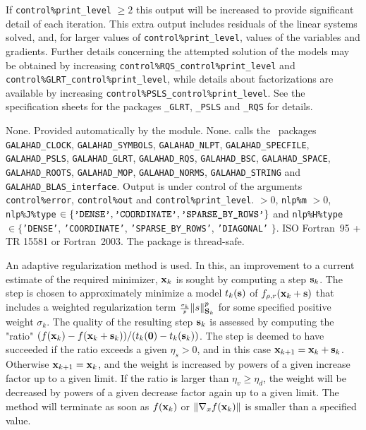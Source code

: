 \documentclass{galahad}
\newcommand{\packagename}{NLS}
\begin{document}
If {\tt control\%print\_level} $\geq 2$ this
output will be increased to provide significant detail of each iteration.
This extra output includes residuals of the linear systems solved, and,
for larger values of {\tt control\%print\_level}, values of the variables
and gradients. Further details concerning the attempted solution of the models
may be obtained by increasing
{\tt control\%RQS\_control\%print\_level}
and
{\tt control\%GLRT\_control\%print\_level},
while details about factorizations are available
by increasing
{\tt control\%PSLS\_control\%print\_level}.
See the specification sheets for the packages
{\tt \libraryname\_GLRT},
{\tt \libraryname\_PSLS} and
{\tt \libraryname\_RQS}
for details.


\galgeneral

\galcommon None.
\galworkspace Provided automatically by the module.
\galroutines None.
\galmodules {\tt \packagename\_solve} calls the \galahad\ packages
{\tt GALAHAD\_CLOCK},
{\tt GALAHAD\_SY\-M\-BOLS}, \sloppy
{\tt GALAHAD\_NLPT},
{\tt GALAHAD\_SPECFILE},
{\tt GALAHAD\_PSLS},
{\tt GALAHAD\_GLRT},
{\tt GALAHAD\_RQS},
{\tt GALAHAD\_BSC},
{\tt GALAHAD\_SPACE},
{\tt GALAHAD\_ROOTS},
{\tt GALAHAD\_MOP},
{\tt GALAHAD\_NORMS},
{\tt GALAHAD\_STRING}
and
{\tt GALAHAD\_BLAS\_interface}.
\galio Output is under control of the arguments
 {\tt control\%error}, {\tt control\%out} and
{\tt control\%print\_level}.
 $> 0$, {\tt nlp\%m} $> 0$,
{\tt nlp\%J\%type} $\in \{
  \mbox{\tt 'DENSE'}, \mbox{\tt 'COORDINATE'}, \mbox{\tt 'SPARSE\_BY\_ROWS'}
 \}$ and
{\tt nlp\%H\%type} $\in \{${\tt 'DENSE'},
 {\tt 'COORDINATE'}, {\tt 'SPARSE\_BY\_ROWS'}, {\tt 'DIAGONAL'} $\}$.
\galportability ISO Fortran~95 + TR 15581 or Fortran~2003.
The package is thread-safe.


\galmethod
An adaptive regularization method is used.
In this, an improvement to a current
estimate of the required minimizer, ${\mathbf{x}}_k$ is sought by computing a
step ${\mathbf{s}}_k$. The step is chosen to approximately minimize a model $t_k({\mathbf{s}})$
of $f_{\rho,r}({\mathbf{x}}_k+{\mathbf{s}})$
that includes a weighted regularization term
${\scriptstyle \frac{\sigma_k}{p}} \|s\|_{{\mathbf{S}}_k}^p$
for some specified positive weight $\sigma_k$. The quality of the
resulting step ${\mathbf{s}}_k$ is assessed by computing the "ratio"
$(f({\mathbf{x}}_k) - f({\mathbf{x}}_k + {\mathbf{s}}_k))/(t_k({\mathbf{0}}) - t_k({\mathbf{s}}_k))$.
The step is deemed to have succeeded if the ratio exceeds a given $\eta_s > 0$,
and in this case ${\mathbf{x}}_{k+1} = {\mathbf{x}}_k + {\mathbf{s}}_k$. Otherwise
${\mathbf{x}}_{k+1} = {\mathbf{x}}_k$, and the weight is increased by powers of a given
increase factor up to a given limit. If the ratio is larger than
$\eta_v \geq \eta_d$, the weight will be decreased by powers of a given
decrease factor again up to a given limit. The method will terminate
as soon as $f({\mathbf{x}}_k)$ or
$\|\nabla_x f({\mathbf{x}}_k)\|$ is smaller than a specified value.
\end{document}
